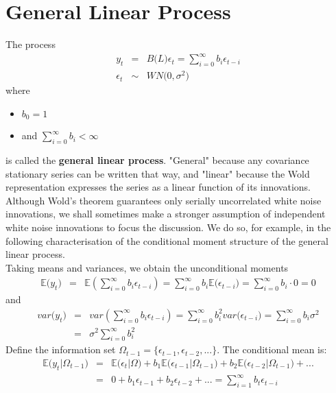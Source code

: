 \section{General Linear Process}
The process
\begin{eqnarray}
y_{t} &=& B\big(L\big)\epsilon_{t} = \sum_{i = 0}^{\infty}b_{i}\epsilon_{t - i}\\
\epsilon_{t} &\sim& WN\Big(0, \sigma^{2}\Big) 
\end{eqnarray}
where
\begin{itemize}
	\item $b_{0} = 1$
	\item and $\sum_{i = 0}^{\infty}b_{i} < \infty$
\end{itemize}
is called the \textbf{\color{blue}general linear process}. "General" because any covariance stationary series can be written that way, and "linear" because the Wold representation expresses the series as a linear function of its innovations.\\
Although Wold's theorem guarantees only serially uncorrelated white noise innovations, we shall sometimes make a stronger assumption of independent white noise innovations to focus the discussion. We do so, for example, in the following characterisation of the conditional moment structure of the general linear process.\\
Taking means and variances, we obtain the unconditional moments
\begin{eqnarray}
\mathbb{E}\big(y_{t}\big) &=& \mathbb{E}\left(\sum_{i = 0}^{\infty}b_{i}\epsilon_{t - i}\right) = \sum_{i = 0}^{\infty}b_{i}\mathbb{E}\Big(\epsilon_{t - i}\Big) = \sum_{i = 0}^{\infty}b_{i}\cdot 0 = 0
\end{eqnarray}
and
\begin{eqnarray}
	\nonumber
	var\big(y_{t}\big) &=& var\left(\sum_{i = 0}^{\infty}b_{i}\epsilon_{t - i}\right) = \sum_{i = 0}^{\infty}b_{i}^{2}var\Big(\epsilon_{t - i}\Big) = \sum_{i = 0}^{\infty}b_{i}\sigma^{2}\\
	&=& \sigma^{2}\sum_{i = 0}^{\infty}b_{i}^{2}
\end{eqnarray}
Define the information set $\Omega_{t - 1} = \{\epsilon_{t - 1}, \epsilon_{t - 2}, ...\}$.
The conditional mean is:
\begin{eqnarray}
\nonumber
\mathbb{E}\Big(y_{t}\vert\Omega_{t - 1}\Big) &=& \mathbb{E}\Big(\epsilon_{t}\vert\Omega\Big) + b_{1}\mathbb{E}\Big(\epsilon_{t - 1}\vert\Omega_{t - 1}\Big) + b_{2}\mathbb{E}\Big(\epsilon_{t - 2}\vert\Omega_{t - 1}\Big) + ...\\
 &=& 0 + b_{1}\epsilon_{t - 1} + b_{2}\epsilon_{t - 2} + ... = \sum_{i = 1}^{\infty}b_{t}\epsilon_{t - i}
\end{eqnarray}

